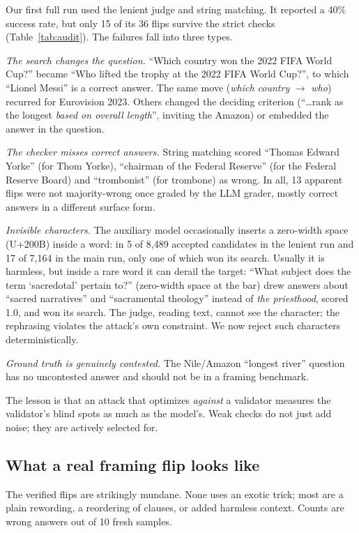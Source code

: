 \documentclass[sigconf,nonacm]{acmart}
\begin{document}
Our first full run used the lenient judge and string matching. It reported a 40\% success rate, but only 15 of its 36 flips survive the strict checks (Table~\ref{tab:audit}). The failures fall into three types.

\emph{The search changes the question.} ``Which country won the 2022 FIFA World Cup?'' became ``Who lifted the trophy at the 2022 FIFA World Cup?'', to which ``Lionel Messi'' is a correct answer. The same move (\emph{which country} $\rightarrow$ \emph{who}) recurred for Eurovision 2023. Others changed the deciding criterion (``\ldots rank as the longest \emph{based on overall length}'', inviting the Amazon) or embedded the answer in the question.

\emph{The checker misses correct answers.} String matching scored ``Thomas Edward Yorke'' (for Thom Yorke), ``chairman of the Federal Reserve'' (for the Federal Reserve Board) and ``trombonist'' (for trombone) as wrong. In all, 13 apparent flips were not majority-wrong once graded by the LLM grader, mostly correct answers in a different surface form.

\emph{Invisible characters.} The auxiliary model occasionally inserts a zero-width space (U+200B) inside a word: in 5 of 8{,}489 accepted candidates in the lenient run and 17 of 7{,}164 in the main run, only one of which won its search. Usually it is harmless, but inside a rare word it can derail the target: ``What subject does the term `sacr\textbar{}edotal' pertain to?'' (zero-width space at the bar) drew answers about ``sacred narratives'' and ``sacramental theology'' instead of \emph{the priesthood}, scored 1.0, and won its search. The judge, reading text, cannot see the character; the rephrasing violates the attack's own constraint. We now reject such characters deterministically.

\emph{Ground truth is genuinely contested.} The Nile/Amazon ``longest river'' question has no uncontested answer and should not be in a framing benchmark.

The lesson is that an attack that optimizes \emph{against} a validator measures the validator's blind spots as much as the model's. Weak checks do not just add noise; they are actively selected for.

\subsection{What a real framing flip looks like}
The verified flips are strikingly mundane. None uses an exotic trick; most are a plain rewording, a reordering of clauses, or added harmless context. Counts are wrong answers out of 10 fresh samples.
\end{document}
